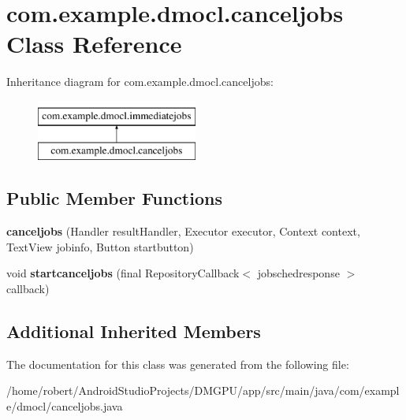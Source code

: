 \hypertarget{classcom_1_1example_1_1dmocl_1_1canceljobs}{}\section{com.\+example.\+dmocl.\+canceljobs Class Reference}
\label{classcom_1_1example_1_1dmocl_1_1canceljobs}
Inheritance diagram for com.\+example.\+dmocl.\+canceljobs\+:\begin{figure}[H]
\begin{center}
\leavevmode
\includegraphics[height=2.000000cm]{classcom_1_1example_1_1dmocl_1_1canceljobs}
\end{center}
\end{figure}
\subsection*{Public Member Functions}
\begin{DoxyCompactItemize}
\item 
\mbox{\label{classcom_1_1example_1_1dmocl_1_1canceljobs_a8a62b3a1ddf01cafbad4e709d9f7b1ea}} 
{\bfseries canceljobs} (Handler result\+Handler, Executor executor, Context context, Text\+View jobinfo, Button startbutton)
\item 
\mbox{\label{classcom_1_1example_1_1dmocl_1_1canceljobs_a1b44f0619185399f3b6a4d16f244f1ef}} 
void {\bfseries startcanceljobs} (final Repository\+Callback$<$ jobschedresponse $>$ callback)
\end{DoxyCompactItemize}
\subsection*{Additional Inherited Members}


The documentation for this class was generated from the following file\+:\begin{DoxyCompactItemize}
\item 
/home/robert/\+Android\+Studio\+Projects/\+D\+M\+G\+P\+U/app/src/main/java/com/example/dmocl/canceljobs.\+java\end{DoxyCompactItemize}
